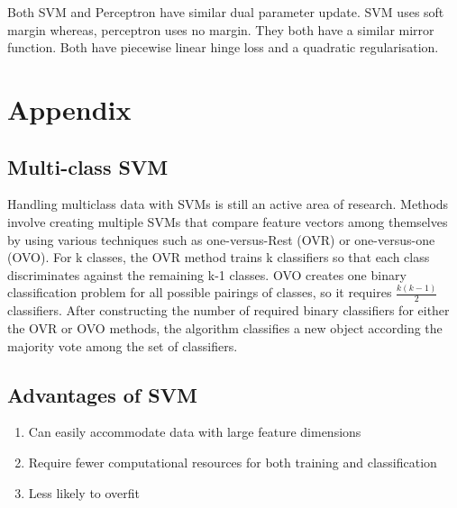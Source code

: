 \documentclass[11pt]{article}
\begin{document}
Both SVM and Perceptron have similar dual parameter update. SVM uses soft margin whereas, perceptron uses no margin. They both have a similar mirror function. Both have piecewise linear hinge loss and a quadratic regularisation.


\pagebreak

\section{Appendix}
\subsection{Multi-class SVM}
Handling multiclass data with SVMs is still an active area of research. Methods involve creating multiple SVMs that compare feature vectors among themselves by using various techniques such as one-versus-Rest (OVR) or one-versus-one (OVO). For k classes, the OVR method trains k classifiers so that each class discriminates against the remaining k-1 classes. OVO creates one binary classification problem for all possible pairings of classes, so it requires $\frac{k(k-1)}{2}$ classifiers\cite{bhattacharyya_2020}. After constructing the number of required binary classifiers for either the OVR or OVO methods, the algorithm classifies a new object according the majority vote among the set of classifiers.
\subsection{Advantages of SVM}
\begin{enumerate}
    \item Can easily accommodate data with large feature dimensions 
    \item Require fewer computational resources for both training and classification\cite{pisner2020support}
    \item Less likely to overfit
\end{enumerate}
\end{document}

